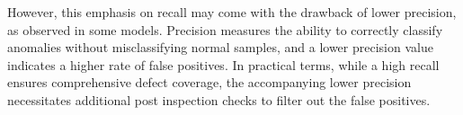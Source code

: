 However, this emphasis on recall may come with the drawback of lower precision, as observed in some models. Precision measures the ability to correctly classify anomalies without misclassifying normal samples, and a lower precision value indicates a higher rate of false positives. In practical terms, while a high recall ensures comprehensive defect coverage, the accompanying lower precision necessitates additional post inspection checks to filter out the false positives.

